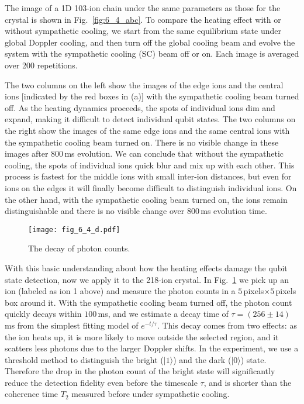 The image of a 1D 103-ion chain under the same parameters as those for the crystal is shown in Fig.~\ref{fig:6_4_abc}. To compare the heating effect with or without sympathetic cooling, we start from the same equilibrium state under global Doppler cooling, and then turn off the global cooling beam and evolve the system with the sympathetic cooling (SC) beam off or on. Each image is averaged over 200 repetitions.

The two columns on the left show the images of the edge ions and the central ions [indicated by the red boxes in (a)] with the sympathetic cooling beam turned off. As the heating dynamics proceeds, the spots of individual ions dim and expand, making it difficult to detect individual qubit states. The two columns on the right show the images of the same edge ions and the same central ions with the sympathetic cooling beam turned on. There is no visible change in these images after $800\,$ms evolution. We can conclude that without the sympathetic cooling, the spots of individual ions quick blur and mix up with each other. This process is fastest for the middle ions with small inter-ion distances, but even for ions on the edges it will finally become difficult to distinguish individual ions. On the other hand, with the sympathetic cooling beam turned on, the ions remain distinguishable and there is no visible change over $800\,$ms evolution time.

\begin{figure}
    \centering
    \texttt{[image: fig\_6\_4\_d.pdf]}    \caption{The decay of photon counts.}
    \label{fig:6_4_d}
\end{figure}

With this basic understanding about how the heating effects damage the qubit state detection, now we apply it to the 218-ion crystal. In Fig.~\ref{fig:6_4_d} we pick up an ion (labeled as ion 1 above) and measure the photon counts in a $5\,$pixels$\times5\,$pixels box around it. With the sympathetic cooling beam turned off, the photon count quickly decays within $100\,$ms, and we estimate a decay time of $\tau=(256\pm14)\,$ms from the simplest fitting model of $e^{-t/\tau}$. This decay comes from two effects: as the ion heats up, it is more likely to move outside the selected region, and it scatters less photons due to the larger Doppler shifts. In the experiment, we use a threshold method to distinguish the bright ($|1\rangle$) and the dark ($|0\rangle$) state. Therefore the drop in the photon count of the bright state will significantly reduce the detection fidelity even before the timescale $\tau$, and is shorter than the coherence time $T_2$ measured before under sympathetic cooling.

